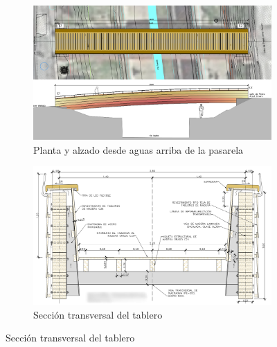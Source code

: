 \documentclass[a4paper,11pt ]{xc_webpage_project}
\renewcommand{\widhtLeftCol}{0.50\textwidth} %
\renewcommand{\widhtRigthCol}{0.45\textwidth} %
\begin{document}
\begin{figure}[h]
  \begin{subfigure}[l]{\widhtLeftCol}
  \centering
  \includegraphics[width=\textwidth]{figures/planta_alzado}
  \caption{Planta y alzado desde aguas arriba de la pasarela}
  \end{subfigure}
\hfill
  \begin{subfigure}[r]{\widhtRigthCol}
  \centering
  \includegraphics[width=\textwidth]{figures/sec_transv}
  \caption{Sección transversal del tablero}
  \end{subfigure}
  \end{figure}
\end{document}
